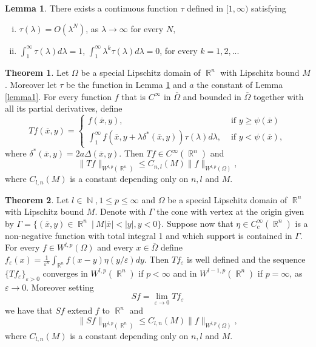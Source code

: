 \documentclass[12pt]{article}
\theoremstyle{definition}
\newtheorem{theorem}{Theorem}
\newtheorem{lemma}{Lemma}
\DeclareMathOperator\rr{\mathbb{R}}
\DeclareMathOperator\nn{\mathbb{N}}
\begin{document}
\begin{lemma}\label{lemma2}
There exists a continuous function $\tau$ defined in $[1,\infty)$ satisfying
\begin{enumerate}[i)]
	\item $\tau(\lambda)=O(\lambda^N)$, as $\lambda \rightarrow \infty$ for every $N,$
	\item $\int_1^\infty \tau(\lambda)d\lambda=1$, $\int_1^\infty \lambda^k\tau(\lambda)d\lambda=0$, for every $k=1,2,...$
\end{enumerate}
\end{lemma}


\begin{theorem}\label{defT}Let $\Omega$ be a special Lipschitz domain of $\rr^n$ with Lipschitz bound $M$. Moreover let $\tau$ be the function in Lemma \ref{lemma2} and $a$ the constant of Lemma \ref{lemma1}. For every function $f$ that is $C^\infty$ in $\overline \Omega$ and bounded in $\overline \Omega$ together with all its partial derivatives, define
\[ Tf(\overline x, y)= \begin{cases}
						f(\overline x, y), & \text{ if } y\ge\psi(\overline x) \\
						\int_1^\infty f(\overline x, y+ \lambda \delta^*(\overline x,y))\tau(\lambda)d\lambda, & \text{ if } y<\psi(\overline x),		
\end{cases}
\]
where $\delta^*(\overline x,y)=2a\Delta(\overline x, y).$ Then $Tf \in C^\infty(\rr^n)$ and 
\[\| Tf\|_{W^{l,p}(\rr^n)}\le C_{n,l}(M) \| f\|_{W^{l,p}(\Omega)} ,\]
where $C_{l,n}(M)$ is a constant depending only on $n,l$ and $M.$
\end{theorem}

\begin{theorem}\label{Sdef}
Let $l \in \nn,1\le p \le \infty$ and $\Omega$ be a special Lipschitz domain of $\rr^n$ with Lipschitz bound $M$. Denote with $\Gamma$ the cone with vertex at the origin given by $\Gamma=\{(\overline x, y) \in \rr^n \ | \ M |\overline x|<|y|, y<0 \}$. Suppose now that $\eta \in C^\infty_c(\rr^n)$ is a non-negative function with total integral 1 and which support is contained in $\Gamma.$ For every $f \in W^{l,p}(\Omega)$ and every $x \in \overline \Omega$ define $f_\varepsilon(x)=\frac{1}{\varepsilon^n}\int_{\rr^n} f(x-y) \eta(y/\varepsilon)dy$. Then $Tf_\varepsilon $ is well defined and the sequence $\{Tf_\varepsilon \}_{\varepsilon>0}$ converges in $W^{l,p}(\rr^n)$ if $p<\infty$ and in $W^{l-1,p}(\rr^n)$ if $p=\infty$, as $\varepsilon \to 0.$ Moreover setting
\[ Sf=\lim_{\varepsilon \to 0} Tf_\varepsilon\]
we have that $Sf$ extend $f$ to $\rr^n$ and 
\[ \| Sf\|_{W^{l,p}(\rr^n)} \le C_{l,n}(M) \| f\|_{W^{l,p}(\Omega) } ,\] 
where $C_{l,n}(M)$ is a constant depending only on $n,l$ and $M.$
\end{theorem}
\end{document}
